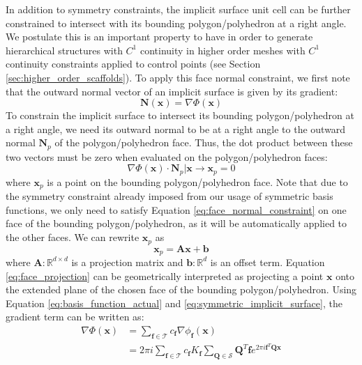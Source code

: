 \documentclass[acmtog]{acmart}
\begin{document}
In addition to symmetry constraints, the implicit surface unit cell can be further constrained to intersect with its bounding polygon/polyhedron at a right angle. We postulate this is an important property to have in order to generate hierarchical structures with $C^1$ continuity in higher order meshes with $C^1$ continuity constraints applied to control points (see Section \ref{sec:higher_order_scaffolds}). To apply this face normal constraint, we first note that the outward normal vector of an implicit surface is given by its gradient:
%
\begin{equation}
  \mathbf{N}(\mathbf{x}) = \nabla \Phi(\mathbf{x})
\end{equation}
%
To constrain the implicit surface to intersect its bounding polygon/polyhedron at a right angle, we need its outward normal to be at a right angle to the outward normal $\mathbf{N}_p$ of the polygon/polyhedron face. Thus, the dot product between these two vectors must be zero when evaluated on the polygon/polyhedron faces:
%
\begin{equation}
  \label{eq:face_normal_constraint}
  \nabla \Phi(\mathbf{x}) \cdot \mathbf{N}_p \rvert \mathbf{x} \rightarrow \mathbf{x}_p = 0
\end{equation}
%
where $\mathbf{x}_p$ is a point on the bounding polygon/polyhedron face. Note that due to the symmetry constraint already imposed from our usage of symmetric basis functions, we only need to satisfy Equation \ref{eq:face_normal_constraint} on one face of the bounding polygon/polyhedron, as it will be automatically applied to the other faces. We can rewrite $\mathbf{x}_p$ as
%
\begin{equation}
  \label{eq:face_projection}
  \mathbf{x}_p = \mathbf{A} \mathbf{x} + \mathbf{b}
\end{equation}
%
where $\mathbf{A} : \mathbb{R}^{d \times d}$ is a projection matrix and $\mathbf{b} : \mathbb{R}^d $ is an offset term. Equation \ref{eq:face_projection} can be geometrically interpreted as projecting a point $\mathbf{x}$ onto the extended plane of the chosen face of the bounding polygon/polyhedron. Using Equation \ref{eq:basis_function_actual} and \ref{eq:symmetric_implicit_surface}, the gradient term can be written as:
%
\begin{equation}
  \begin{split}
    \nabla \Phi(\mathbf{x}) &= \sum\limits_{\mathbf{f} \in \mathcal{T}} c_{\mathbf{f}} \nabla \phi_{\mathbf{f}}(\mathbf{x}) \\
    &= 2 \pi i \sum\limits_{\mathbf{f} \in \mathcal{T}} c_{\mathbf{f}} K_{\mathbf{f}} \sum\limits_{\mathbf{Q} \in \mathcal{S}} \mathbf{Q}^T \mathbf{f} e^{2 \pi i \mathbf{f}^T \mathbf{Q} \mathbf{x}}
  \end{split}
\end{equation}
%
\end{document}
